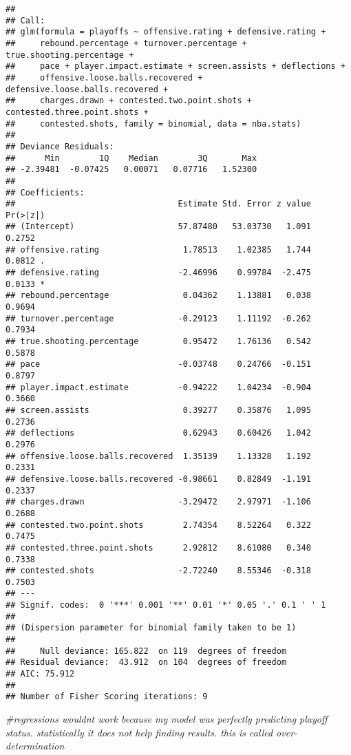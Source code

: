\documentclass[
]{article}
\newenvironment{Shaded}{\begin{snugshade}}{\end{snugshade}}
\newcommand{\CommentTok}[1]{\textcolor[rgb]{0.56,0.35,0.01}{\textit{#1}}}
\begin{document}
\begin{verbatim}
## 
## Call:
## glm(formula = playoffs ~ offensive.rating + defensive.rating + 
##     rebound.percentage + turnover.percentage + true.shooting.percentage + 
##     pace + player.impact.estimate + screen.assists + deflections + 
##     offensive.loose.balls.recovered + defensive.loose.balls.recovered + 
##     charges.drawn + contested.two.point.shots + contested.three.point.shots + 
##     contested.shots, family = binomial, data = nba.stats)
## 
## Deviance Residuals: 
##      Min        1Q    Median        3Q       Max  
## -2.39481  -0.07425   0.00071   0.07716   1.52300  
## 
## Coefficients:
##                                 Estimate Std. Error z value Pr(>|z|)  
## (Intercept)                     57.87480   53.03730   1.091   0.2752  
## offensive.rating                 1.78513    1.02385   1.744   0.0812 .
## defensive.rating                -2.46996    0.99784  -2.475   0.0133 *
## rebound.percentage               0.04362    1.13881   0.038   0.9694  
## turnover.percentage             -0.29123    1.11192  -0.262   0.7934  
## true.shooting.percentage         0.95472    1.76136   0.542   0.5878  
## pace                            -0.03748    0.24766  -0.151   0.8797  
## player.impact.estimate          -0.94222    1.04234  -0.904   0.3660  
## screen.assists                   0.39277    0.35876   1.095   0.2736  
## deflections                      0.62943    0.60426   1.042   0.2976  
## offensive.loose.balls.recovered  1.35139    1.13328   1.192   0.2331  
## defensive.loose.balls.recovered -0.98661    0.82849  -1.191   0.2337  
## charges.drawn                   -3.29472    2.97971  -1.106   0.2688  
## contested.two.point.shots        2.74354    8.52264   0.322   0.7475  
## contested.three.point.shots      2.92812    8.61080   0.340   0.7338  
## contested.shots                 -2.72240    8.55346  -0.318   0.7503  
## ---
## Signif. codes:  0 '***' 0.001 '**' 0.01 '*' 0.05 '.' 0.1 ' ' 1
## 
## (Dispersion parameter for binomial family taken to be 1)
## 
##     Null deviance: 165.822  on 119  degrees of freedom
## Residual deviance:  43.912  on 104  degrees of freedom
## AIC: 75.912
## 
## Number of Fisher Scoring iterations: 9
\end{verbatim}

\begin{Shaded}
\begin{Highlighting}[]
\CommentTok{\#regressions wouldnt work because my model was perfectly predicting playoff status. statistically it does not help finding results. this is called over{-}determination}
\end{Highlighting}
\end{Shaded}
\end{document}
